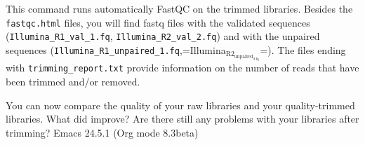\documentclass[11pt]{article}
\begin{document}
This command runs automatically FastQC on the trimmed
libraries. Besides the \texttt{fastqc.html} files, you will find fastq files
with the validated sequences (\texttt{Illumina\_R1\_val\_1.fq},
\texttt{Illumina\_R2\_val\_2.fq}) and with the unpaired sequences
(\texttt{Illumina\_R1\_unpaired\_1.fq},=Illumina\(_{\text{R2}}_{\text{unpaired}}_{\text{2.fq}}\)=).  The files
ending with \texttt{trimming\_report.txt} provide information on the number of
reads that have been trimmed and/or removed.

You can now compare the quality of your raw libraries and your
quality-trimmed libraries. What did improve? Are there still any
problems with your libraries after trimming?
Emacs 24.5.1 (Org mode 8.3beta)
\end{document}
